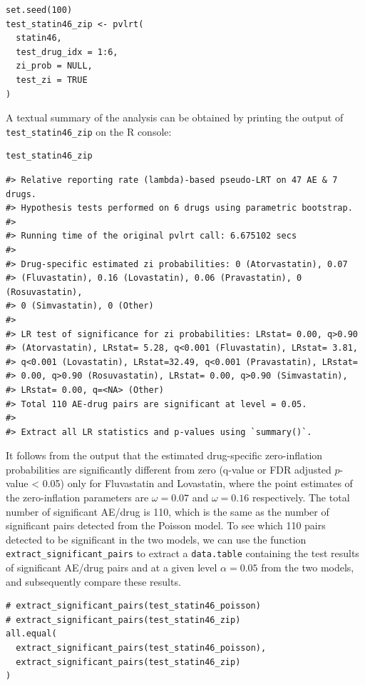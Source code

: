 \begin{verbatim}
set.seed(100) 
test_statin46_zip <- pvlrt(   
  statin46,   
  test_drug_idx = 1:6,   
  zi_prob = NULL,
  test_zi = TRUE
)
\end{verbatim}

\noindent A textual summary of the analysis can be obtained by printing the output of \texttt{test\_statin46\_zip} on the R console:

\begin{verbatim}
test_statin46_zip
\end{verbatim}

\begin{verbatim}
#> Relative reporting rate (lambda)-based pseudo-LRT on 47 AE & 7 drugs.
#> Hypothesis tests performed on 6 drugs using parametric bootstrap.
#> 
#> Running time of the original pvlrt call: 6.675102 secs
#> 
#> Drug-specific estimated zi probabilities: 0 (Atorvastatin), 0.07
#> (Fluvastatin), 0.16 (Lovastatin), 0.06 (Pravastatin), 0 (Rosuvastatin),
#> 0 (Simvastatin), 0 (Other)
#> 
#> LR test of significance for zi probabilities: LRstat= 0.00, q>0.90
#> (Atorvastatin), LRstat= 5.28, q<0.001 (Fluvastatin), LRstat= 3.81,
#> q<0.001 (Lovastatin), LRstat=32.49, q<0.001 (Pravastatin), LRstat=
#> 0.00, q>0.90 (Rosuvastatin), LRstat= 0.00, q>0.90 (Simvastatin),
#> LRstat= 0.00, q=<NA> (Other)
#> Total 110 AE-drug pairs are significant at level = 0.05.
#> 
#> Extract all LR statistics and p-values using `summary()`.
\end{verbatim}

It follows from the output that the estimated drug-specific zero-inflation probabilities are significantly different from zero (q-value or FDR adjusted \(p\)-value \textless{} 0.05) only for Fluvastatin and Lovastatin, where the point estimates of the zero-inflation parameters are \(\omega = 0.07\) and \(\omega = 0.16\) respectively. The total number of significant AE/drug is 110, which is the same as the number of significant pairs detected from the Poisson model. To see which 110 pairs detected to be significant in the two models, we can use the function \texttt{extract\_significant\_pairs} to extract a \texttt{data.table} containing the test results of significant AE/drug pairs and at a given level \(\alpha = 0.05\) from the two models, and subsequently compare these results.

\begin{verbatim}
# extract_significant_pairs(test_statin46_poisson)
# extract_significant_pairs(test_statin46_zip)
all.equal(
  extract_significant_pairs(test_statin46_poisson),
  extract_significant_pairs(test_statin46_zip)
)
\end{verbatim}

